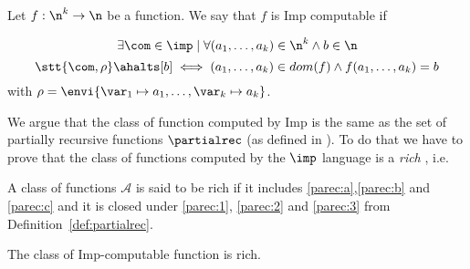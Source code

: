 
\begin{definition}
  Let \(f : \n^k \to \n\) be a function. We say that \(f\) is Imp
  computable if

  \[\exists \com \in\imp \mid \forall (a_1, \dots, a_k) \in \n^k \wedge
  b \in \n \] \[\stt{\com, \rho} \ahalts[b] \iff (a_1, \dots, a_k)
  \in dom(f) \wedge f(a_1,\dots,a_k) = b\] with \(\rho = \envi{\var_1
    \mapsto a_1, \dots, \var_k \mapsto a_k}\).
\end{definition}

We argue that the class of function computed by Imp is the same as the
set of partially recursive functions \(\partialrec\) (as defined in
\cite{cutland1980computability}). To do that we have to prove that the
class of functions computed by the \(\imp\) language is a \emph{rich}
, i.e.

\begin{definition}
  A class of functions \(\mathcal{A}\) is said to be rich if it
  includes \ref{parec:a},\ref{parec:b} and \ref{parec:c} and it is
  closed under \ref{parec:1}, \ref{parec:2} and \ref{parec:3} from
  Definition~\ref{def:partialrec}.
\end{definition}

\begin{lemma}
  The class of Imp-computable function is rich.
\end{lemma}

